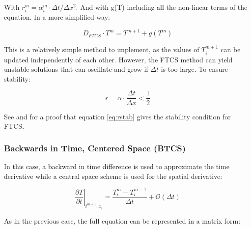 With $r^m_i = \alpha^m_i \cdot \Delta t/ \Delta x^2$. And with g(T) including all the non-linear terms of the equation. In a more simplified way: 

\begin{equation}
    D_{FTCS}\cdot T^{m} = T^{m+1}+g(T^m)
\end{equation}

This is a relatively simple method to implement, as the values of $T_i^{m+1}$ can be updated independently of each other. However, the FTCS method can yield unstable solutions that can oscillate and grow if $\Delta t$ is too large. To ensure stability: 

\begin{equation}
    r = \alpha\cdot \frac{\Delta t}{\Delta x} < \frac{1}{2}
    \label{eq:rstab}
\end{equation}

See \parencite[][]{ref:proveR1} and \parencite[][]{ref:proveR2} for a proof that equation \ref{eq:rstab} gives the stability condition for FTCS. 

\subsubsection{Backwards in Time, Centered Space (BTCS)}

In this case, a backward in time difference is used to approximate the time derivative while a central space scheme is used for the spatial derivative: 

\begin{equation}
    \left. \frac{\partial T}{\partial t} \right|_{t^{m+1},x_i} = \frac{T^m_i - T^{m-1}_i}{\Delta t}+\mathcal{O}(\Delta t)
\end{equation}

As in the previous case, the full equation can be represented in a matrix form: 

